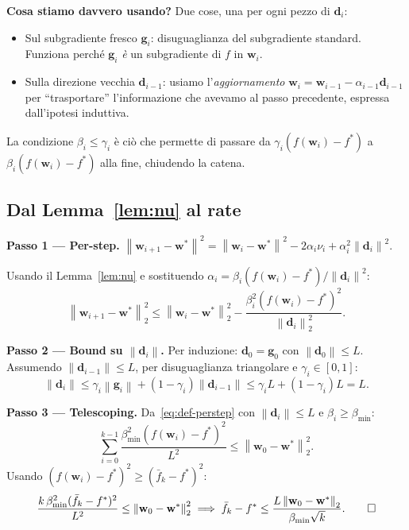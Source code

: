 \documentclass[11pt,a4paper]{article}
\newcommand{\norm}[1]{\left\|#1\right\|}
\newcommand{\bw}{\mathbf{w}}
\newcommand{\bg}{\mathbf{g}}
\newcommand{\bd}{\mathbf{d}}
\theoremstyle{definition}
\begin{document}
\begin{tcolorbox}[intuition]
\textbf{Cosa stiamo davvero usando?} Due cose, una per ogni pezzo di $\bd_i$:
\begin{itemize}[leftmargin=*]
\item Sul subgradiente fresco $\bg_i$: disuguaglianza del subgradiente standard. Funziona perché $\bg_i$ \emph{è} un subgradiente di $f$ in $\bw_i$.
\item Sulla direzione vecchia $\bd_{i-1}$: usiamo l'\emph{aggiornamento} $\bw_i = \bw_{i-1} - \alpha_{i-1}\bd_{i-1}$ per ``trasportare'' l'informazione che avevamo al passo precedente, espressa dall'ipotesi induttiva.
\end{itemize}
La condizione $\beta_i\le\gamma_i$ è ciò che permette di passare da $\gamma_i(f(\bw_i)-f^*)$ a $\beta_i(f(\bw_i)-f^*)$ alla fine, chiudendo la catena.
\end{tcolorbox}

\subsection{Dal Lemma~\ref{lem:nu} al rate}

\textbf{Passo 1 — Per-step.}
$\norm{\bw_{i+1}-\bw^*}^2 = \norm{\bw_i-\bw^*}^2 - 2\alpha_i\nu_i + \alpha_i^2\norm{\bd_i}^2$.

Usando il Lemma~\ref{lem:nu} e sostituendo $\alpha_i = \beta_i(f(\bw_i)-f^*)/\norm{\bd_i}^2$:
\begin{equation}
\label{eq:def-perstep}
\norm{\bw_{i+1}-\bw^*}_2^2 \le \norm{\bw_i-\bw^*}_2^2 - \frac{\beta_i^2(f(\bw_i)-f^*)^2}{\norm{\bd_i}_2^2}.
\end{equation}

\textbf{Passo 2 — Bound su $\norm{\bd_i}$.} Per induzione: $\bd_0=\bg_0$ con $\norm{\bd_0}\le L$. Assumendo $\norm{\bd_{i-1}}\le L$, per disuguaglianza triangolare e $\gamma_i\in[0,1]$:
\[
\norm{\bd_i} \le \gamma_i\norm{\bg_i} + (1-\gamma_i)\norm{\bd_{i-1}} \le \gamma_i L + (1-\gamma_i)L = L.
\]

\textbf{Passo 3 — Telescoping.} Da~\eqref{eq:def-perstep} con $\norm{\bd_i}\le L$ e $\beta_i\ge\beta_{\min}$:
\[
\sum_{i=0}^{k-1}\frac{\beta_{\min}^2(f(\bw_i)-f^*)^2}{L^2} \le \norm{\bw_0-\bw^*}_2^2.
\]
Usando $(f(\bw_i)-f^*)^2\ge(\bar f_k-f^*)^2$:
\[
\frac{k\,\beta_{\min}^2(\bar f_k-f^*)^2}{L^2} \le \norm{\bw_0-\bw^*}_2^2 \;\Longrightarrow\; \bar f_k-f^* \le \frac{L\norm{\bw_0-\bw^*}_2}{\beta_{\min}\sqrt{k}}.\qed
\]
\end{document}
